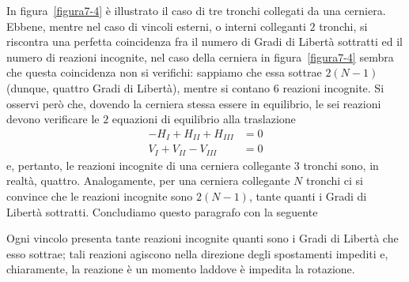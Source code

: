 \noindent In figura~\ref{figura7-4} è illustrato il caso di tre tronchi collegati da una cerniera. Ebbene, mentre nel caso di vincoli esterni, o interni colleganti $2$ tronchi, si riscontra una perfetta coincidenza fra il numero di Gradi di Libertà sottratti ed il numero di reazioni incognite, nel caso della cerniera in figura~\ref{figura7-4} sembra che questa coincidenza non si verifichi: sappiamo che essa sottrae $2(N-1)$ (dunque, quattro Gradi di Libertà), mentre si contano $6$ reazioni incognite. Si osservi però che, dovendo la cerniera stessa essere in equilibrio, le sei reazioni devono verificare le $2$ equazioni di equilibrio alla traslazione
\begin{align*}
-H_I + H_{II} + H_{III} &= 0 \\ 
V_I + V_{II} - V_{III} &=0
\end{align*}
\noindent e, pertanto, le reazioni incognite di una cerniera collegante $3$ tronchi sono, in realtà, quattro. Analogamente, per una cerniera collegante $N$ tronchi ci si convince che le reazioni incognite sono $2(N-1)$, tante quanti i Gradi di Libertà sottratti. Concludiamo questo paragrafo con la seguente 
\begin{prop}
Ogni vincolo presenta tante reazioni incognite quanti sono i Gradi di Libertà che esso sottrae; tali reazioni agiscono nella direzione degli spostamenti impediti e, chiaramente, la reazione è un momento laddove è impedita la rotazione.
\end{prop}
